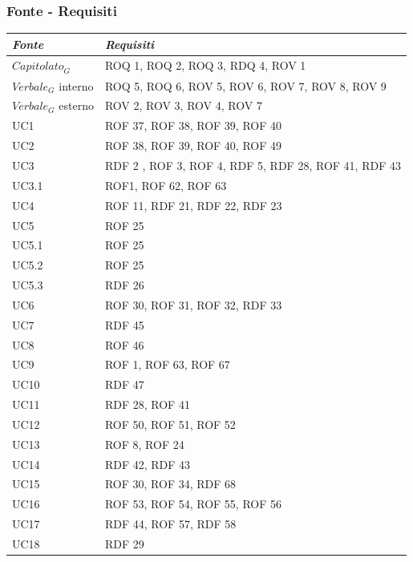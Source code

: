 \documentclass[12pt, oneside]{article}
\begin{document}
\subsubsection{Fonte - Requisiti}
\begin{longtable}{|p{4cm}|p{12cm}|}
    \hline
    \emph{Fonte} & \emph{Requisiti}\\
    \hline
    \endfirsthead
    \endhead
    $\textit{Capitolato}_G$ & ROQ 1, ROQ 2, ROQ 3, RDQ 4, ROV 1 \\
    \hline
    $\textit{Verbale}_G$ interno & ROQ 5, ROQ 6, ROV 5, ROV 6, ROV 7, ROV 8, ROV 9 \\
    \hline
    $\textit{Verbale}_G$ esterno & ROV 2, ROV 3, ROV 4, ROV 7 \\
    \hline
    UC1 & ROF 37, ROF 38, ROF 39, ROF 40 \\
    \hline
    UC2 & ROF 38, ROF 39, ROF 40, ROF 49  \\
    \hline
    UC3 & RDF 2 , ROF 3, ROF 4, RDF 5, RDF 28, ROF 41, RDF 43 \\
    \hline 
    UC3.1 & ROF1, ROF 62, ROF 63 \\
    \hline
    UC4 & ROF 11, RDF 21, RDF 22, RDF 23 \\
    \hline
    UC5 & ROF 25 \\
    \hline
    UC5.1 & ROF 25 \\
    \hline
    UC5.2 & ROF 25 \\
    \hline
    UC5.3 & RDF 26 \\
    \hline
    UC6 & ROF 30, ROF 31, ROF 32, RDF 33 \\
    \hline
    UC7 & RDF 45  \\
    \hline
    UC8 & ROF 46 \\
    \hline
    UC9 & ROF 1, ROF 63, ROF 67 \\
    \hline
    UC10 & RDF 47 \\
    \hline
    UC11 & RDF 28, ROF 41 \\
    \hline
    UC12 & ROF 50, ROF 51, ROF 52 \\
    \hline
    UC13 & ROF 8, ROF 24 \\
    \hline
    UC14 & RDF 42, RDF 43 \\
    \hline
    UC15 & ROF 30, ROF 34, RDF 68 \\
    \hline
    UC16 & ROF 53, ROF 54, ROF 55, ROF 56 \\
    \hline
    UC17 & RDF 44, ROF 57, RDF 58 \\
    \hline
    UC18 & RDF 29 \\

\end{longtable}
\end{document}
